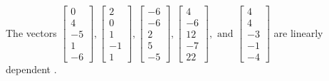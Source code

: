 \begin{exercise}
\begin{exerciseStatement}
  \end{exerciseStatement}
  \begin{exerciseAnswer}
   The vectors \(\left[\begin{array}{r}
0 \\
4 \\
-5 \\
1 \\
-6
\end{array}\right] , \left[\begin{array}{r}
2 \\
0 \\
1 \\
-1 \\
1
\end{array}\right] , \left[\begin{array}{r}
-6 \\
-6 \\
2 \\
5 \\
-5
\end{array}\right] , \left[\begin{array}{r}
4 \\
-6 \\
12 \\
-7 \\
22
\end{array}\right] , \text{ and } \left[\begin{array}{r}
4 \\
4 \\
-3 \\
-1 \\
-4
\end{array}\right]\) are 
  	 linearly dependent  .
  


  \end{exerciseAnswer}
\end{exercise}